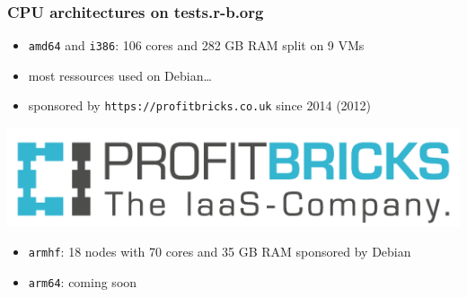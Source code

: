 \documentclass[14pt]{beamer}
\begin{document}
\begin{frame}
 \frametitle{CPU architectures on tests.r-b.org}

 \begin{itemize}
  \item \texttt{amd64} and \texttt{i386}: 106 cores and 282 GB RAM split on 9 VMs
  \item most ressources used on Debian…
 \item sponsored by \texttt{https://profitbricks.co.uk} since 2014 (2012)
 \end{itemize}
 \begin{center}
  \includegraphics[height=0.2\paperheight]{images/profitbricks_logo.png}
  \vfill
 \end{center}
 \begin{itemize}
  \item \texttt{armhf}: 18 nodes with 70 cores and 35 GB RAM sponsored by
  Debian
  \item \texttt{arm64}: coming soon
 \end{itemize}
\end{frame}
\end{document}

